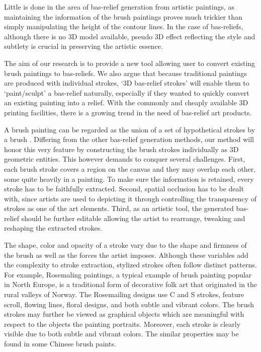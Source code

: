Little is done in the area of bas-relief generation from artistic paintings, as maintaining the information of the brush paintings proves much trickier than simply manipulating the height of the contour lines. In the case of bas-reliefs, although there is no 3D model available, pseudo 3D effect reflecting the style and subtlety is crucial in preserving the artistic essence.

The aim of our research is to provide a new tool allowing user to convert existing brush paintings to bas-reliefs. We also argue that because traditional paintings are produced with individual strokes, ‘3D bas-relief strokes’ will enable them to ‘paint/sculpt’ a bas-relief naturally, especially if they wanted to quickly convert an existing painting into a relief. With the commonly and cheaply available 3D printing facilities, there is a growing trend in the need of bas-relief art products.

A brush painting can be regarded as the union of a set of hypothetical strokes by a brush \cite{xu2006animating}. Differing from the other bas-relief generation methods, our method will honor this very feature by constructing the brush strokes individually as 3D geometric entities. This however demands to conquer several challenges. First, each brush stroke covers a region on the canvas and they may overlap each other, some quite heavily in a painting. To make sure the information is retained, every stroke has to be faithfully extracted. Second, spatial occlusion has to be dealt with, since artists are used to depicting it through controlling the transparency of strokes as one of the art elements. Third, as an artistic tool, the generated bas-relief should be further editable allowing the artist to rearrange, tweaking and reshaping the extracted strokes.

The shape, color and opacity of a stroke vary due to the shape and firmness of the brush as well as the forces the artist imposes. Although these variables add the complexity to stroke extraction, stylized strokes often follow distinct patterns. For example, Rosemaling paintings, a typical example of brush painting popular in North Europe, is a traditional form of decorative folk art that originated in the rural valleys of Norway. The Rosemailing designs use C and S strokes, feature scroll, flowing lines, floral designs, and both subtle and vibrant colors. The brush strokes may further be viewed as graphical objects which are meaningful with respect to the objects the painting portraits. Moreover, each stroke is clearly visible due to both subtle and vibrant colors. The similar properties may be found in some Chinese brush paints.

